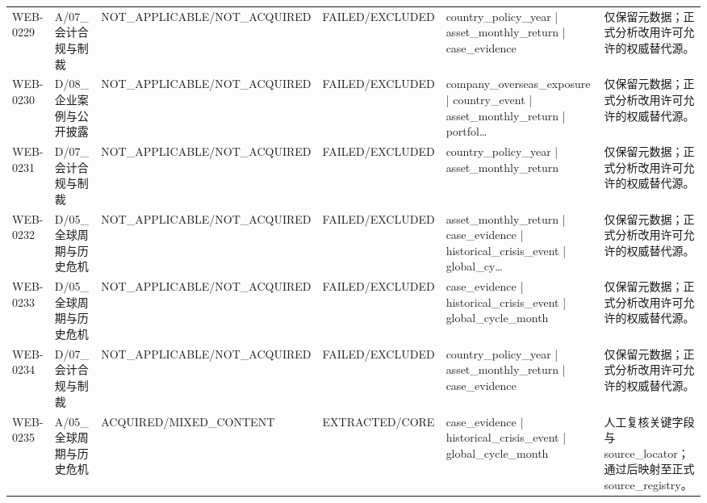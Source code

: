 \begin{landscape}
\begin{longtable}{p{1.8cm}p{2.6cm}p{2.6cm}p{2.6cm}p{4.8cm}p{7.2cm}}
WEB-0229 & A/\allowbreak{}07\_\allowbreak{}会计合规与制裁 & NOT\_\allowbreak{}APPLICABLE/\allowbreak{}NOT\_\allowbreak{}ACQUIRED & FAILED/\allowbreak{}EXCLUDED & country\_\allowbreak{}policy\_\allowbreak{}year | asset\_\allowbreak{}monthly\_\allowbreak{}return | case\_\allowbreak{}evidence & 仅保留元数据；正式分析改用许可允许的权威替代源。\\
WEB-0230 & D/\allowbreak{}08\_\allowbreak{}企业案例与公开披露 & NOT\_\allowbreak{}APPLICABLE/\allowbreak{}NOT\_\allowbreak{}ACQUIRED & FAILED/\allowbreak{}EXCLUDED & company\_\allowbreak{}overseas\_\allowbreak{}exposure | country\_\allowbreak{}event | asset\_\allowbreak{}monthly\_\allowbreak{}return | portfol… & 仅保留元数据；正式分析改用许可允许的权威替代源。\\
WEB-0231 & D/\allowbreak{}07\_\allowbreak{}会计合规与制裁 & NOT\_\allowbreak{}APPLICABLE/\allowbreak{}NOT\_\allowbreak{}ACQUIRED & FAILED/\allowbreak{}EXCLUDED & country\_\allowbreak{}policy\_\allowbreak{}year | asset\_\allowbreak{}monthly\_\allowbreak{}return & 仅保留元数据；正式分析改用许可允许的权威替代源。\\
WEB-0232 & D/\allowbreak{}05\_\allowbreak{}全球周期与历史危机 & NOT\_\allowbreak{}APPLICABLE/\allowbreak{}NOT\_\allowbreak{}ACQUIRED & FAILED/\allowbreak{}EXCLUDED & asset\_\allowbreak{}monthly\_\allowbreak{}return | case\_\allowbreak{}evidence | historical\_\allowbreak{}crisis\_\allowbreak{}event | global\_\allowbreak{}cy… & 仅保留元数据；正式分析改用许可允许的权威替代源。\\
WEB-0233 & D/\allowbreak{}05\_\allowbreak{}全球周期与历史危机 & NOT\_\allowbreak{}APPLICABLE/\allowbreak{}NOT\_\allowbreak{}ACQUIRED & FAILED/\allowbreak{}EXCLUDED & case\_\allowbreak{}evidence | historical\_\allowbreak{}crisis\_\allowbreak{}event | global\_\allowbreak{}cycle\_\allowbreak{}month & 仅保留元数据；正式分析改用许可允许的权威替代源。\\
WEB-0234 & D/\allowbreak{}07\_\allowbreak{}会计合规与制裁 & NOT\_\allowbreak{}APPLICABLE/\allowbreak{}NOT\_\allowbreak{}ACQUIRED & FAILED/\allowbreak{}EXCLUDED & country\_\allowbreak{}policy\_\allowbreak{}year | asset\_\allowbreak{}monthly\_\allowbreak{}return | case\_\allowbreak{}evidence & 仅保留元数据；正式分析改用许可允许的权威替代源。\\
WEB-0235 & A/\allowbreak{}05\_\allowbreak{}全球周期与历史危机 & ACQUIRED/\allowbreak{}MIXED\_\allowbreak{}CONTENT & EXTRACTED/\allowbreak{}CORE & case\_\allowbreak{}evidence | historical\_\allowbreak{}crisis\_\allowbreak{}event | global\_\allowbreak{}cycle\_\allowbreak{}month & 人工复核关键字段与source\_\allowbreak{}locator；通过后映射至正式source\_\allowbreak{}registry。\\

\end{longtable}
\end{landscape}
